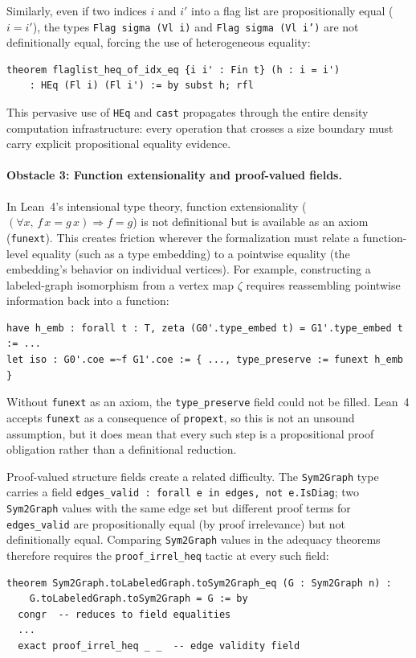 \documentclass{article}
\newcommand{\lean}[1]{\texttt{#1}}
\begin{document}
Similarly, even if two indices $i$ and $i'$ into a flag list are propositionally
equal ($i = i'$), the types \lean{Flag sigma (Vl i)} and \lean{Flag sigma (Vl i')}
are not definitionally equal, forcing the use of heterogeneous equality:
\begin{lstlisting}
theorem flaglist_heq_of_idx_eq {i i' : Fin t} (h : i = i')
    : HEq (Fl i) (Fl i') := by subst h; rfl
\end{lstlisting}
This pervasive use of \lean{HEq} and \lean{cast} propagates through the entire
density computation infrastructure: every operation that crosses a size boundary
must carry explicit propositional equality evidence.

\paragraph{Obstacle 3: Function extensionality and proof-valued fields.}
In Lean~4's intensional type theory, function extensionality
($(\forall x,\, f\,x = g\,x) \Rightarrow f = g$) is not definitional but is
available as an axiom (\lean{funext}).  This creates friction wherever the
formalization must relate a function-level equality (such as a type embedding)
to a pointwise equality (the embedding's behavior on individual vertices).
For example, constructing a labeled-graph isomorphism from a vertex map $\zeta$
requires reassembling pointwise information back into a function:
\begin{lstlisting}
have h_emb : forall t : T, zeta (G0'.type_embed t) = G1'.type_embed t := ...
let iso : G0'.coe =~f G1'.coe := { ..., type_preserve := funext h_emb }
\end{lstlisting}
Without \lean{funext} as an axiom, the \lean{type\_preserve} field could not
be filled.  Lean~4 accepts \lean{funext} as a consequence of \lean{propext},
so this is not an unsound assumption, but it does mean that every such step is a
propositional proof obligation rather than a definitional reduction.

Proof-valued structure fields create a related difficulty.  The \lean{Sym2Graph}
type carries a field \lean{edges\_valid : forall e in edges, not e.IsDiag}; two
\lean{Sym2Graph} values with the same edge set but different proof terms for
\lean{edges\_valid} are propositionally equal (by proof irrelevance) but not
definitionally equal.  Comparing \lean{Sym2Graph} values in the adequacy
theorems therefore requires the \lean{proof\_irrel\_heq} tactic at every
such field:
\begin{lstlisting}
theorem Sym2Graph.toLabeledGraph.toSym2Graph_eq (G : Sym2Graph n) :
    G.toLabeledGraph.toSym2Graph = G := by
  congr  -- reduces to field equalities
  ...
  exact proof_irrel_heq _ _  -- edge validity field
\end{lstlisting}
\end{document}
